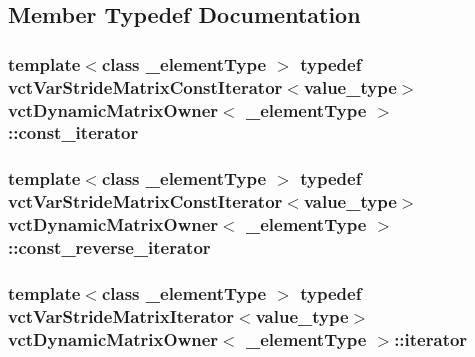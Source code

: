 \subsection{Member Typedef Documentation}
\hypertarget{classvct_dynamic_matrix_owner_ac83fab5858a222a2debcf2059c9f06e2}{
\subsubsection[{const\-\_\-iterator}]{\setlength{\rightskip}{0pt plus 5cm}template$<$class \-\_\-element\-Type $>$ typedef {\bf vct\-Var\-Stride\-Matrix\-Const\-Iterator}$<$value\-\_\-type$>$ {\bf vct\-Dynamic\-Matrix\-Owner}$<$ \-\_\-element\-Type $>$\-::{\bf const\-\_\-iterator}}}\label{classvct_dynamic_matrix_owner_ac83fab5858a222a2debcf2059c9f06e2}
\hypertarget{classvct_dynamic_matrix_owner_a3f5a649a5285f9909e4628151d9cdac1}{
\subsubsection[{const\-\_\-reverse\-\_\-iterator}]{\setlength{\rightskip}{0pt plus 5cm}template$<$class \-\_\-element\-Type $>$ typedef {\bf vct\-Var\-Stride\-Matrix\-Const\-Iterator}$<$value\-\_\-type$>$ {\bf vct\-Dynamic\-Matrix\-Owner}$<$ \-\_\-element\-Type $>$\-::{\bf const\-\_\-reverse\-\_\-iterator}}}\label{classvct_dynamic_matrix_owner_a3f5a649a5285f9909e4628151d9cdac1}
\hypertarget{classvct_dynamic_matrix_owner_aa723836eb06a7ae230e80ec85a44e059}{
\subsubsection[{iterator}]{\setlength{\rightskip}{0pt plus 5cm}template$<$class \-\_\-element\-Type $>$ typedef {\bf vct\-Var\-Stride\-Matrix\-Iterator}$<$value\-\_\-type$>$ {\bf vct\-Dynamic\-Matrix\-Owner}$<$ \-\_\-element\-Type $>$\-::{\bf iterator}}}\label{classvct_dynamic_matrix_owner_aa723836eb06a7ae230e80ec85a44e059}
